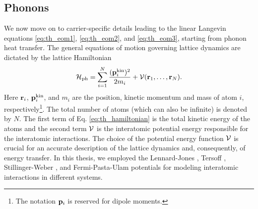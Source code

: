 \subsection{Phonons}

\label{sec:th_eom2_phonon}


We now move on to carrier-specific details leading to the linear Langevin equations \eqref{eq:th_eom1}, \eqref{eq:th_eom2}, and \eqref{eq:th_eom3}, starting from phonon heat transfer. The general equations of motion governing lattice dynamics are dictated by the lattice Hamiltonian \cite{ziman}
\begin{equation}
 \mathcal{H}_{\textrm{ph}} = \sum_{i=1}^N \frac{(\mathbf{p}^{\textrm{kin}}_i)^2}{2m_i} + \mathcal{V}(\mathbf{r}_1,\dots,\mathbf{r}_N). \label{eq:th_hamiltonian}
\end{equation}
Here $\mathbf{r}_i$, $\mathbf{p}^{\textrm{kin}}_i$, and $m_i$ are the position, kinetic momentum and mass of atom $i$, respectively\footnote{The notation $\mathbf{p}_i$ is reserved for dipole moments.}. The total number of atoms (which can also be infinite) is denoted by $N$. The first term of Eq. \eqref{eq:th_hamiltonian} is the total kinetic energy of the atoms and the second term $\mathcal{V}$ is the interatomic potential energy responsible for the interatomic interactions. The choice of the potential energy function $\mathcal{V}$ is crucial for an accurate description of the lattice dynamics and, consequently, of energy transfer. In this thesis, we employed the Lennard-Jones \cite{allentildesley}, Tersoff \cite{tersoff88a}, Stillinger-Weber \cite{stillinger85}, and Fermi-Pasta-Ulam \cite{fermi55} potentials for modeling interatomic interactions in different systems.  %

